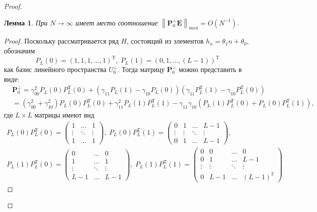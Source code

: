 \documentclass[specialist,
substylefile = spbu_report.rtx,
subf,href,colorlinks=true, 12pt]{disser}
\newcommand\norm[1]{\left\|#1\right\|}
\newtheorem{lemma}{Лемма}
\begin{document}
\begin{proof}
		
		\begin{lemma}
			При $N\rightarrow\infty$ имеет место соотношение $\norm{\mathbf{P}_0^{\bot}\mathbf{E}}_{\max} = O(N^{-1}).$
		\end{lemma}
		\begin{proof}
			Поскольку рассматривается ряд $H$, состоящий из элементов $h_n = \theta_1n + \theta_0$, обозначим
			\begin{equation*}
				P_L(0)=(1,1,1,\dots,1)^\mathrm{T},\; P_L(1)=(0,1,\dots,(L-1))^\mathrm{T}
			\end{equation*}
			как базис линейного пространства $U_0^\bot$. Тогда матрицу $\mathbf{P}_0^\bot$ можно представить в виде:
			\begin{align}
				&\mathbf{P}_0^\bot=\gamma_{00}^2P_L(0)P_L^\mathrm{T}(0)+(\gamma_{11}P_L(1)-\gamma_{10}P_L(0))(\gamma_{11}P_L^\mathrm{T}(1)-\gamma_{10}P_L^\mathrm{T}(0))\nonumber
				\\
				&=(\gamma_{00}^2+\gamma_{10}^2)P_L(0)P_L^\mathrm{T}(0)+\gamma_{11}^2P_L(1)P_L^\mathrm{T}(1)-\gamma_{11}\gamma_{10}(P_L(1)P_L^\mathrm{T}(0)+P_L(0)P_L^\mathrm{T}(1)),\label{eq:l_3}
			\end{align}
			где $L\times L$ матрицы имеют вид
			\begin{align*}
				P_L(0)P_L^\mathrm{T}(0)=
				\begin{pmatrix}
					1 & \dots & 1\\
					\vdots & \ddots & \vdots\\
					1 & \dots & 1
				\end{pmatrix}
				,\; P_L(0)P_L^\mathrm{T}(1)=
				\begin{pmatrix}
					0&1&\dots&L-1\\
					\vdots&\vdots&\ddots&\vdots\\
					0&1&\dots&L-1
				\end{pmatrix}
				,\\
				P_L(1)P_L^\mathrm{T}(0)=
				\begin{pmatrix}
					0&\dots&0\\
					1&\dots&1\\
					\vdots&\ddots&\vdots\\
					L-1&\dots&L-1
				\end{pmatrix}
				,\; P_L(1)P_L^\mathrm{T}(1)=
				\begin{pmatrix}
					0&0&\dots&0\\
					0&1&\dots&L-1\\
					\vdots&\vdots&\ddots&\vdots\\
					0&L-1&\dots&(L-1)^2

\end{pmatrix}
\end{align*}
\end{proof}
\end{proof}
\end{document}
